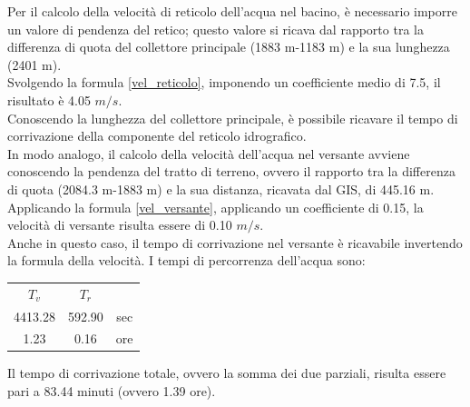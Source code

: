 Per il calcolo della velocità di reticolo dell'acqua nel bacino, è necessario imporre un valore di pendenza del retico; questo valore si ricava dal rapporto tra la differenza di quota del collettore principale (1883 m-1183 m) e la sua lunghezza (2401 m).\\
Svolgendo la formula \ref{vel_reticolo}, imponendo un coefficiente medio di 7.5, il risultato è 4.05 $m/s$.\\
Conoscendo la lunghezza del collettore principale, è possibile ricavare il tempo di corrivazione della componente del reticolo idrografico.\\
In modo analogo, il calcolo della velocità dell'acqua nel versante avviene conoscendo la pendenza del tratto di terreno, ovvero il rapporto tra la differenza di quota (2084.3 m-1883 m) e la sua distanza, ricavata dal GIS, di 445.16 m.\\
Applicando la formula \ref{vel_versante}, applicando un coefficiente di 0.15, la velocità di versante risulta essere di 0.10 $m/s$.\\
Anche in questo caso, il tempo di corrivazione nel versante è ricavabile invertendo la formula della velocità.
I tempi di percorrenza dell'acqua sono:
\begin{table}[H] \centering
    \begin{tabular}{ccc}
        \toprule
    \textbf{$T_v$} & \textbf{$T_r$} & {\color[HTML]{000000} } \\
    4413.28     & 592.90      & sec                     \\
    1.23        & 0.16        & ore       \\
    \bottomrule             
    \end{tabular}
    \end{table}
Il tempo di corrivazione totale, ovvero la somma dei due parziali, risulta essere pari a 83.44 minuti (ovvero 1.39 ore).


